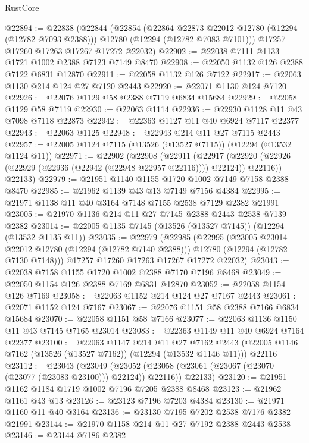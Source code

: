 \begin{lexlean}{RustCore}
\begin{coremodule}
@22894 := @22838
    (@22844
      (@22854
        (@22864 @22873 @22012 @12780 (@12294 (@12782 @7093 @2388)))
        @12780
        (@12294 (@12782 @7083 @7101)))
      @17257
      @17260
      @17263
      @17267
      @17272
      @22032)
@22902 := @22038 @7111 @1133 @1721 @1002 @2388 @7123 @7149 @8470
@22908 := @22050 @1132 @126 @2388 @7122 @6831 @12870
@22911 := @22058 @1132 @126 @7122
@22917 := @22063 @1130 @214 @124 @27 @7120 @2443
@22920 := @22071 @1130 @124 @7120
@22926 := @22076 @1129 @58 @2388 @7119 @6834 @15684
@22929 := @22058 @1129 @58 @7119
@22930 := @22063 @1114
@22936 := @22930 @1128 @11 @43 @7098 @7118 @22873
@22942 := @22363 @1127 @11 @40 @6924 @7117 @22377
@22943 := @22063 @1125
@22948 := @22943 @214 @11 @27 @7115 @2443
@22957 := @22005 @1124 @7115 (@13526 (@13527 @7115)) (@12294 (@13532 @1124 @11))
@22971 := @22902
    (@22908
      (@22911
        (@22917 (@22920 (@22926 (@22929 (@22936 (@22942 (@22948 @22957 @22116)))) @22124)) @22116))
      @22133)
@22979 := @21951 @1140 @1155 @1720 @1002 @7149 @7158 @2388 @8470
@22985 := @21962 @1139 @43 @13 @7149 @7156 @4384
@22995 := @21971 @1138 @11 @40 @3164 @7148 @7155 @2538 @7129 @2382 @21991
@23005 := @21970 @1136 @214 @11 @27 @7145 @2388 @2443 @2538 @7139 @2382
@23014 := @22005 @1135 @7145 (@13526 (@13527 @7145)) (@12294 (@13532 @1135 @11))
@23035 := @22979
    (@22985
      (@22995
        (@23005 @23014 @22012 @12780 (@12294 (@12782 @7140 @2388)))
        @12780
        (@12294 (@12782 @7130 @7148)))
      @17257
      @17260
      @17263
      @17267
      @17272
      @22032)
@23043 := @22038 @7158 @1155 @1720 @1002 @2388 @7170 @7196 @8468
@23049 := @22050 @1154 @126 @2388 @7169 @6831 @12870
@23052 := @22058 @1154 @126 @7169
@23058 := @22063 @1152 @214 @124 @27 @7167 @2443
@23061 := @22071 @1152 @124 @7167
@23067 := @22076 @1151 @58 @2388 @7166 @6834 @15684
@23070 := @22058 @1151 @58 @7166
@23077 := @22063 @1136 @1150 @11 @43 @7145 @7165 @23014
@23083 := @22363 @1149 @11 @40 @6924 @7164 @22377
@23100 := @22063
    @1147
    @214
    @11
    @27
    @7162
    @2443
    (@22005 @1146 @7162 (@13526 (@13527 @7162)) (@12294 (@13532 @1146 @11)))
    @22116
@23112 := @23043
    (@23049
      (@23052 (@23058 (@23061 (@23067 (@23070 (@23077 (@23083 @23100))) @22124)) @22116))
      @22133)
@23120 := @21951 @1162 @1184 @1719 @1002 @7196 @7205 @2388 @8468
@23123 := @21962 @1161 @43 @13
@23126 := @23123 @7196 @7203 @4384
@23130 := @21971 @1160 @11 @40 @3164
@23136 := @23130 @7195 @7202 @2538 @7176 @2382 @21991
@23144 := @21970 @1158 @214 @11 @27 @7192 @2388 @2443 @2538
@23146 := @23144 @7186 @2382

\end{coremodule}
\end{lexlean}
